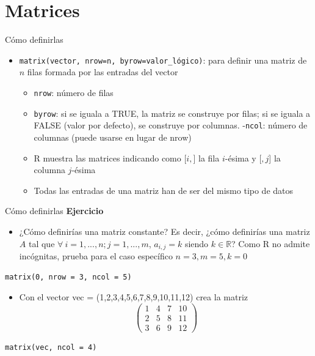\documentclass[
  ignorenonframetext,
]{beamer}
\providecommand{\tightlist}{%
  \setlength{\itemsep}{0pt}\setlength{\parskip}{0pt}}
\begin{document}
\section{Matrices}\label{matrices-3}

\begin{frame}[fragile]{Cómo definirlas}
\label{cuxf3mo-definirlas}
\begin{itemize}
\tightlist
\item
  \texttt{matrix(vector,\ nrow=n,\ byrow=valor\_lógico)}: para definir
  una matriz de \(n\) filas formada por las entradas del vector

  \begin{itemize}
  \tightlist
  \item
    \texttt{nrow}: número de filas
  \item
    \texttt{byrow}: si se iguala a TRUE, la matriz se construye por
    filas; si se iguala a FALSE (valor por defecto), se construye por
    columnas. -\texttt{ncol}: número de columnas (puede usarse en lugar
    de nrow)
  \item
    R muestra las matrices indicando como {[}\(i,\){]} la fila
    \(i\)-ésima y {[}\(,j\){]} la columna \(j\)-ésima
  \item
    Todas las entradas de una matriz han de ser del mismo tipo de datos
  \end{itemize}
\end{itemize}
\end{frame}

\begin{frame}[fragile]{Cómo definirlas}
\label{cuxf3mo-definirlas-1}
\textbf{Ejercicio}

\begin{itemize}
\tightlist
\item
  ¿Cómo definirías una matriz constante? Es decir, ¿cómo definirías una
  matriz \(A\) tal que \(\forall\  i=1,...,n; j = 1,...,m\),
  \(a_{i,j}=k\) siendo \(k\in\mathbb{R}\)? Como R no admite incógnitas,
  prueba para el caso específico \(n = 3, m = 5, k = 0\)
\end{itemize}

\begin{verbatim}
matrix(0, nrow = 3, ncol = 5)
\end{verbatim}

\begin{itemize}
\tightlist
\item
  Con el vector vec = (1,2,3,4,5,6,7,8,9,10,11,12) crea la matriz
  \[\begin{pmatrix}
  1 & 4 & 7 & 10\\
  2 & 5 & 8 & 11\\
  3 & 6 & 9 & 12
  \end{pmatrix}\]
\end{itemize}

\begin{verbatim}
matrix(vec, ncol = 4)
\end{verbatim}
\end{frame}
\end{document}
